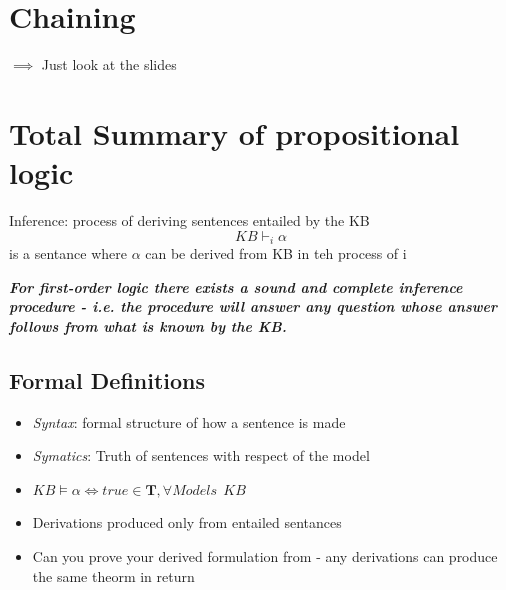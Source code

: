 \documentclass{article}
\theoremstyle{mytheoremstyle}
\theoremstyle{mytheoremstyle}
\theoremstyle{myproblemstyle}
\begin{document}
\section{Chaining}
$\implies$ Just look at the slides

\section{Total Summary of propositional logic}
\begin{theorem}
	Inference: process of deriving sentences entailed by the KB
	\begin{displaymath}
		KB \vdash_i \alpha
	\end{displaymath}
	is a sentance where \( \alpha  \) can be derived from KB in teh process of i
\end{theorem}

\textbf{\textit{For first-order logic there exists a sound and complete inference procedure
		- i.e. the procedure will answer any question whose answer follows from
		what is known by the KB.}}

\subsection{Formal Definitions}
\begin{itemize}
	\item \begin{definition}[Syntax]
		      \textit{Syntax}: formal structure of how a sentence is made
	      \end{definition}
	\item \begin{definition}[Semantics]
		      \textit{Symatics}: Truth of sentences with respect of the model
	      \end{definition}
	\item \begin{definition}[Entailment]
		      \( KB \models \alpha \iff true \in \mathbf{T}, \forall Models \ \ KB\)
	      \end{definition}
	\item \begin{definition}[Sound]
		      Derivations produced only from entailed sentances
	      \end{definition}

	\item \begin{definition}[Completeness]
		      Can you prove your derived formulation from - any derivations can produce the same theorm in return
	      \end{definition}
\end{itemize}
\end{document}
